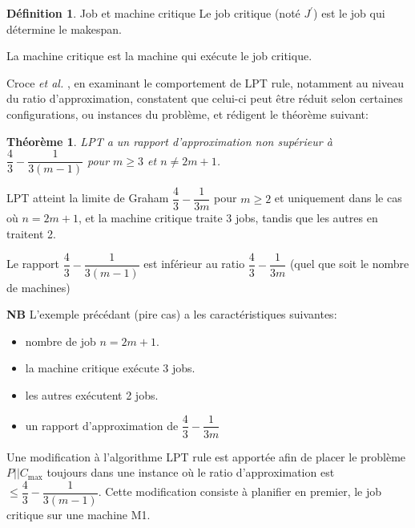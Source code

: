 \documentclass[a4paper,12pt]{report}
\theoremstyle{plain}				%
\newtheorem{theoreme}{Théorème}	%
\theoremstyle{definition}				%
\newtheorem{definition}{Définition} %
\newcommand\problemGrahamP{$P||C_{\max}$\xspace}
\newcommand{\lp}[1]{\todo[author=LP,color=yellow,inline]{#1}}
\newcommand{\lcc}[1]{\todo[author=LCC,color=green,inline]{#1}}
\newcommand{\fco}[1]{\todo[author=FCO,color=blue,inline]{#1}}
\begin{document}
\bigskip

\begin{definition}{Job et machine critique}
Le job critique (noté $J^\prime$) est le job qui détermine le
makespan.

La machine critique est la machine qui exécute le job critique.
\end{definition}

Croce \emph{et al.}
\cite{della2018longest}, en examinant le comportement de LPT rule,
notamment au niveau du ratio d'approximation, constatent que celui-ci
peut être réduit selon certaines configurations, ou instances du
problème, et rédigent le théorème suivant:

\begin{theoreme}
  LPT a un rapport d'approximation non supérieur à\\
  $\dfrac{4}{3} - \dfrac{1}{3(m-1)}$ pour $m \geq 3$ et $n \neq 2m+1$.
\end{theoreme}

\bigskip
LPT atteint la limite de Graham $\dfrac{4}{3} - \dfrac{1}{3m}$ pour
$m \geq 2$ et uniquement dans le cas où $n=2m+1$, et la machine
critique traite 3 jobs, tandis que les autres en traitent 2.





Le rapport $\dfrac{4}{3} - \dfrac{1}{3(m-1)}$ est inférieur au
ratio $\dfrac{4}{3} - \dfrac{1}{3m}$ (quel que soit le nombre de
machines)

\bigskip

\textbf{NB}
\lp{Tout ceci est déjà dit}
L'exemple précédant (pire cas) a les caractéristiques suivantes:
\begin{itemize}
	\item nombre de job $n=2m+1$.
	\item la machine critique exécute 3 jobs.
	\item les autres exécutent 2 jobs.
	\item un rapport d'approximation de $\dfrac{4}{3} - \dfrac{1}{3m}$
\end{itemize}

\bigskip

Une modification à l'algorithme LPT rule est apportée afin de placer
le problème \problemGrahamP toujours dans une instance où le ratio
d'approximation est $\leq \dfrac{4}{3} - \dfrac{1}{3(m-1)}$.
Cette modification consiste à planifier en premier, le job critique
sur une machine M1.
\end{document}
